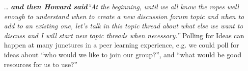 \ldots{} \textbf{\emph{and then Howard said}}\emph{``At the beginning,
until we all know the ropes well enough to understand when to create a
new discussion forum topic and when to add to an existing one, let's
talk in this topic thread about what else we want to discuss and I will
start new topic threads when necessary.''}
Polling for Ideas can happen at many junctures in a peer learning
experience, e.g. we could poll for ideas about ``who would we like to
join our group?'', and ``what would be good resources for us to use?''
